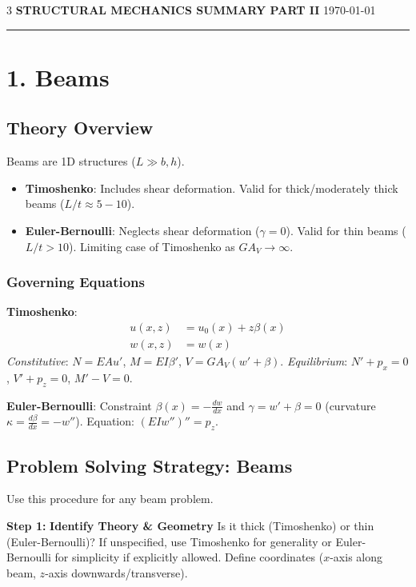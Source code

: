 \documentclass[8pt]{extarticle}
\newcommand{\step}[1]{\textbf{\scriptsize Step #1:}}
\begin{document}
\begin{multicols*}{3}
\raggedcolumns
\footnotesize \textbf{STRUCTURAL MECHANICS SUMMARY PART II} \hfill \today
\vspace{2pt}
\hrule
\vspace{2pt}

\section{1. Beams}
\subsection{Theory Overview}
Beams are 1D structures ($L \gg b, h$).
\begin{itemize}[leftmargin=*]
    \item \textbf{Timoshenko}: Includes shear deformation. Valid for thick/moderately thick beams ($L/t \approx 5-10$).
    \item \textbf{Euler-Bernoulli}: Neglects shear deformation ($\gamma=0$). Valid for thin beams ($L/t > 10$). Limiting case of Timoshenko as $GA_V \to \infty$.
\end{itemize}

\subsubsection{Governing Equations}
\textbf{Timoshenko}:
\begin{align*}
    u(x,z) &= u_0(x) + z\beta(x) \\
    w(x,z) &= w(x)
\end{align*}
\textit{Constitutive}:
$N = EA u'$, $M = EI \beta'$, $V = GA_V (w'+\beta)$.
\textit{Equilibrium}:
$N' + p_x = 0$, $V' + p_z = 0$, $M' - V = 0$.

\textbf{Euler-Bernoulli}:
Constraint $\beta(x) = -\frac{dw}{dx}$ and $\gamma = w' + \beta = 0$ (curvature $\kappa = \frac{d\beta}{dx} = -w''$).
Equation: $(EI w'')'' = p_z$.

\subsection{Problem Solving Strategy: Beams}
Use this procedure for any beam problem.

\step{1} \textbf{Identify Theory \& Geometry}
Is it thick (Timoshenko) or thin (Euler-Bernoulli)?
If unspecified, use Timoshenko for generality or Euler-Bernoulli for simplicity if explicitly allowed.
Define coordinates ($x$-axis along beam, $z$-axis downwards/transverse).


\end{multicols*}
\end{document}
